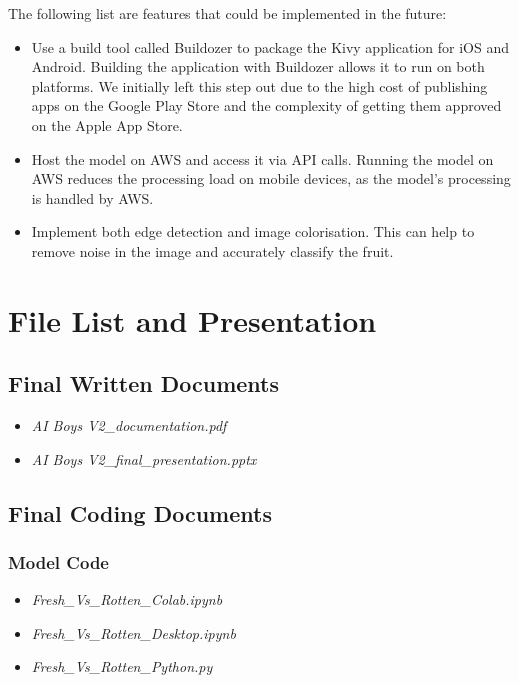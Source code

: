 \documentclass[conference]{IEEEtran}
\begin{document}
The following list are features that could be implemented in the future:
\begin{itemize}
    \item Use a build tool called Buildozer to package the Kivy application for iOS and Android. Building the application with Buildozer allows it to run on both platforms. We initially left this step out due to the high cost of publishing apps on the Google Play Store and the complexity of getting them approved on the Apple App Store. %
    \item Host the model on AWS and access it via API calls. Running the model on AWS reduces the processing load on mobile devices, as the model's processing is handled by AWS.
    \item Implement both edge detection and image colorisation. This can help to remove noise in the image and accurately classify the fruit.
\end{itemize}

\section{File List and Presentation}

\subsection{Final Written Documents}
\begin{itemize}
    \item \textit{AI Boys V2\_documentation.pdf}
    \item \textit{AI Boys V2\_final\_presentation.pptx}
\end{itemize}

\subsection{Final Coding Documents}

\subsubsection{Model Code}
\begin{itemize}
    \item \textit{Fresh\_Vs\_Rotten\_Colab.ipynb}
    \item \textit{Fresh\_Vs\_Rotten\_Desktop.ipynb}
    \item \textit{Fresh\_Vs\_Rotten\_Python.py}
\end{itemize}
\end{document}
